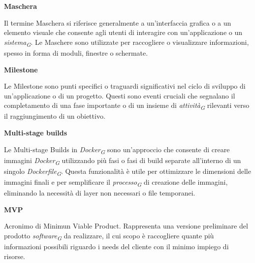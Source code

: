 \documentclass{article}
\begin{document}
\vspace{0.4cm}

\textbf{Maschera}

\vspace{0.1cm}

Il termine Maschera si riferisce generalmente a un'interfaccia grafica o a un elemento visuale che consente agli utenti di interagire con un'applicazione o un \textit{sistema}\textsubscript{\textit{G}}. Le Maschere sono utilizzate per raccogliere o visualizzare informazioni, spesso in forma di moduli, finestre o schermate.

\vspace{0.4cm}

\textbf{Milestone}

\vspace{0.1cm}

Le Milestone sono punti specifici o traguardi significativi nel ciclo di sviluppo di un'applicazione o di un progetto. Questi sono eventi cruciali che segnalano il completamento di una fase importante o di un insieme di \textit{attività}\textsubscript{\textit{G}} rilevanti verso il raggiungimento di un obiettivo.

\vspace{0.4cm}

\textbf{Multi-stage builds}

\vspace{0.1cm}

Le Multi-stage Builds in \textit{Docker}\textsubscript{\textit{G}} sono un'approccio che consente di creare immagini \textit{Docker}\textsubscript{\textit{G}} utilizzando più fasi o fasi di build separate all'interno di un singolo \textit{Dockerfile}\textsubscript{\textit{G}}. Questa funzionalità è utile per ottimizzare le dimensioni delle immagini finali e per semplificare il \textit{processo}\textsubscript{\textit{G}} di creazione delle immagini, eliminando la necessità di layer non necessari o file temporanei.

\vspace{0.4cm}

\textbf{MVP}

\vspace{0.1cm}

Acronimo di Minimun Viable Product. Rappresenta una versione preliminare del prodotto \textit{software}\textsubscript{\textit{G}} da realizzare, il cui scopo è raccogliere quante più informazioni possibili riguardo i needs del cliente con il minimo impiego di risorse.
\end{document}
